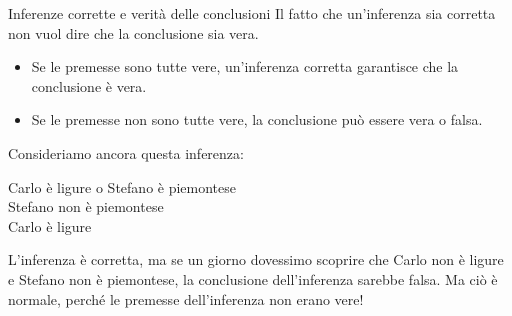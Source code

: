 \documentclass[aspectratio=169,10pt,dvipsnames,handout]{beamer}
\begin{document}
\begin{frame}{Inferenze corrette e verità delle conclusioni}
	Il fatto che un'inferenza sia corretta non vuol dire che la conclusione sia vera.
	\begin{itemize}
		\item \alert{Se le premesse sono tutte vere}, un'inferenza corretta garantisce che la conclusione è vera.
		\item \alert{Se le premesse non sono tutte vere}, la conclusione può essere vera o falsa.
	\end{itemize}

	\medskip
	Consideriamo ancora questa inferenza:

	\begin{center}
		\begin{inference}
			Carlo è ligure o Stefano è piemontese\\
			Stefano non è piemontese\\
			\hline
			Carlo è ligure
		\end{inference}
	\end{center}

	\medskip
	L'inferenza è corretta, ma se un giorno dovessimo scoprire che Carlo non è ligure  e Stefano non è piemontese, la conclusione dell'inferenza sarebbe falsa. Ma ciò è normale, perché le premesse dell'inferenza non erano vere!
\end{frame}
\end{document}
